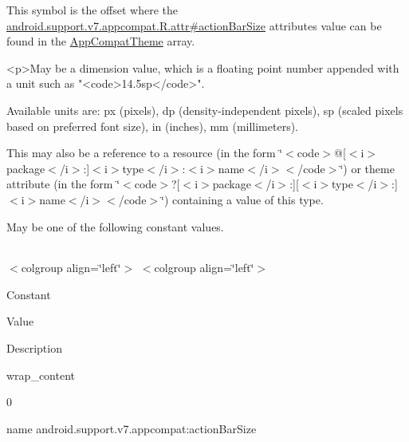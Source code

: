 This symbol is the offset where the \hyperlink{classandroid_1_1support_1_1v7_1_1appcompat_1_1R_1_1attr_ada080c72115e2640eef32a1cb3f07176}{android.\+support.\+v7.\+appcompat.\+R.\+attr\#action\+Bar\+Size} attribute\textquotesingle{}s value can be found in the \hyperlink{classandroid_1_1support_1_1v7_1_1appcompat_1_1R_1_1styleable_a5c42f89e8a410c323be34208d75c430b}{App\+Compat\+Theme} array.

\begin{DoxyVerb}      <p>May be a dimension value, which is a floating point number appended with a unit such as "<code>14.5sp</code>".
\end{DoxyVerb}
 Available units are\+: px (pixels), dp (density-\/independent pixels), sp (scaled pixels based on preferred font size), in (inches), mm (millimeters). 

This may also be a reference to a resource (in the form \char`\"{}$<$code$>$@\mbox{[}$<$i$>$package$<$/i$>$\+:\mbox{]}$<$i$>$type$<$/i$>$\+:$<$i$>$name$<$/i$>$$<$/code$>$\char`\"{}) or theme attribute (in the form \char`\"{}$<$code$>$?\mbox{[}$<$i$>$package$<$/i$>$\+:\mbox{]}\mbox{[}$<$i$>$type$<$/i$>$\+:\mbox{]}$<$i$>$name$<$/i$>$$<$/code$>$\char`\"{}) containing a value of this type. 

May be one of the following constant values.

\tabulinesep=1mm
\begin{longtabu} spread 0pt [c]{*{0}{|X[-1]}|}
\hline
\end{longtabu}
$<$colgroup align=\char`\"{}left\char`\"{}$>$ $<$colgroup align=\char`\"{}left\char`\"{}$>$ 

Constant

Value

Description 

{\ttfamily wrap\+\_\+content}

0

name android.\+support.\+v7.\+appcompat\+:action\+Bar\+Size \mbox{\label{classandroid_1_1support_1_1v7_1_1appcompat_1_1R_1_1styleable_ad74d0d401e28273f585ebe1accd70505}} 
